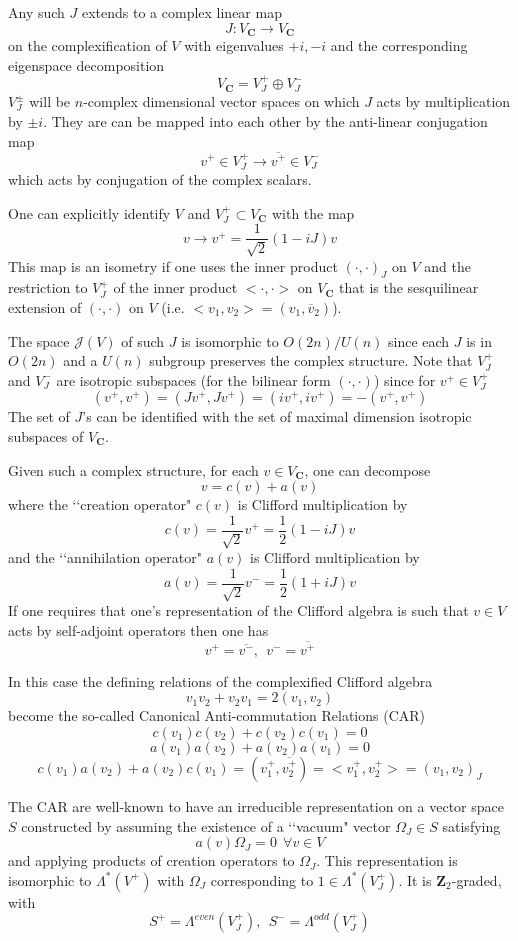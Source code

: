 \documentclass[a4paper,a4paper]{article}
\theoremstyle{conjecture}
\begin{document}
Any such $J$ extends to a complex linear map $$J:V_{\mathbf C}\rightarrow V_{\mathbf C}$$
on the complexification of $V$ with
eigenvalues $+i,-i$ and the corresponding eigenspace decomposition
$$V_{\mathbf C}=V^+_J\oplus V^-_J$$
$V^{\pm}_J$ will be $n$-complex dimensional vector spaces on which $J$ acts by multiplication by $\pm i$.
They are can be mapped into each other by the anti-linear conjugation map
$$v^+\in V^+_J\rightarrow \overline {v^+}\in V^-_J$$
which acts by conjugation of the complex scalars.

One can explicitly identify $V$ and $V^+_J\subset V_{\mathbf C}$ with the map
$$v \rightarrow v^+=\frac{1}{\sqrt{2}}(1-iJ)v$$
This map is an isometry if one uses the inner product $(\cdot,\cdot)_J$ on $V$ and the
restriction to $V^+_J$ of the inner
product $<\cdot,\cdot>$ on $V_{\mathbf C}$ that is the sesquilinear extension of $(\cdot,\cdot)$ on $V$
(i.e. $<v_1,v_2>=(v_1,\overline v_2)$).

The space ${\mathcal J}(V)$ of such $J$ is isomorphic to
$O(2n)/U(n)$ since each $J$ is in $O(2n)$ and a $U(n)$ subgroup
preserves the complex structure. Note that $V^+_J$ and $V^-_J$
are isotropic subspaces (for the bilinear form $(\cdot,\cdot)$)
since for $v^+\in V^+_J$
$$(v^+,v^+)=(Jv^+,Jv^+)=(iv^+,iv^+)=-(v^+,v^+)$$
The set of $J$'s can be identified with the set of maximal dimension isotropic subspaces of $V_{\mathbf C}$.

Given such a complex structure, for each $v\in V_{\mathbf C}$, one
can decompose
$$v=c(v)+a(v)$$
where
the \lq\lq creation operator" $c(v)$ is Clifford multiplication by $$c(v)=\frac{1}{\sqrt{2}}v^+=\frac{1}{2}(1-iJ)v$$
and the \lq\lq annihilation operator" $a(v)$ is Clifford multiplication by
$$a(v)=\frac{1}{\sqrt{2}}v^-=\frac{1}{2}(1+iJ)v$$
If one requires that one's representation of the Clifford algebra
is such that $v\in V$ acts by self-adjoint operators then one has
$$v^+=\overline {v^-},\ \  v^-=\overline{v^+}$$

In this case the defining relations of the complexified Clifford
algebra
$$v_1v_2+v_2v_1=2(v_1,v_2)$$
become the so-called
Canonical Anti-commutation Relations (CAR)
$$c(v_1)c(v_2)+c(v_2)c(v_1)=0$$
$$a(v_1)a(v_2)+a(v_2)a(v_1)=0$$
$$c(v_1)a(v_2)+a(v_2)c(v_1)=(v^+_1,\overline{v^+_2})=<v^+_1,v^+_2>=(v_1,v_2)_J$$

The CAR are well-known to have an irreducible representation on a
vector space $S$ constructed by assuming the existence of a \lq\lq vacuum" vector
$\Omega_J\in S$ satisfying
$$a(v)\Omega_J=0\ \  \forall v\in V$$ and applying products of
creation operators to $\Omega_J$.  This representation is
isomorphic to $\Lambda^*(V^+)$ with $\Omega_J$ corresponding to
$1\in \Lambda^*(V^+_J)$. It is $\mathbf Z_2$-graded, with
$$ S^+=\Lambda^{even}(V^+_J),\ \ S^-=\Lambda^{odd}(V^+_J)$$
\end{document}
